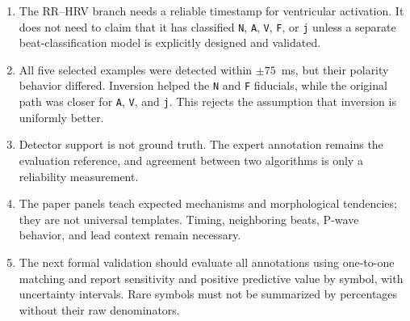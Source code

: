 \documentclass[11pt]{article}
\begin{document}
\begin{enumerate}
\item The RR--HRV branch needs a reliable timestamp for ventricular activation. It does not need to claim that it has classified \texttt{N}, \texttt{A}, \texttt{V}, \texttt{F}, or \texttt{j} unless a separate beat-classification model is explicitly designed and validated.
\item All five selected examples were detected within $\pm 75$~ms, but their polarity behavior differed. Inversion helped the \texttt{N} and \texttt{F} fiducials, while the original path was closer for \texttt{A}, \texttt{V}, and \texttt{j}. This rejects the assumption that inversion is uniformly better.
\item Detector support is not ground truth. The expert annotation remains the evaluation reference, and agreement between two algorithms is only a reliability measurement.
\item The paper panels teach expected mechanisms and morphological tendencies; they are not universal templates. Timing, neighboring beats, P-wave behavior, and lead context remain necessary.
\item The next formal validation should evaluate all annotations using one-to-one matching and report sensitivity and positive predictive value by symbol, with uncertainty intervals. Rare symbols must not be summarized by percentages without their raw denominators.
\end{enumerate}



\end{document}
